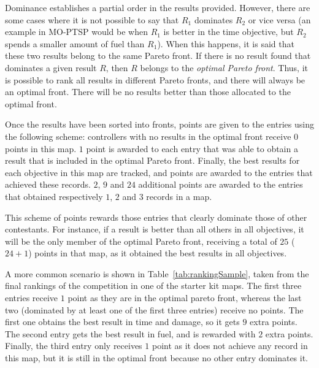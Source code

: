 \documentclass[conference]{IEEEtran}
\begin{document}
Dominance establishes a partial order in the results provided. However, there are some cases where it is not possible to say that $R_1$ dominates $R_2$ or vice versa (an example in MO-PTSP would be when $R_1$ is better in the time objective, but $R_2$ spends a smaller amount of fuel than $R_1$). When this happens, it is said that these two results belong to the same Pareto front. If there is no result found that dominates a given result $R$, then $R$ belongs to the \textit{optimal Pareto front}. Thus, it is possible to rank all results in different Pareto fronts, and there will always be an optimal front. There will be no results better than those allocated to the optimal front. 

Once the results have been sorted into fronts, points are given to the entries using the following scheme: controllers with no results in the optimal front receive $0$ points in this map. $1$ point is awarded to each entry that was able to obtain a result that is included in the optimal Pareto front. Finally, the best results for each objective in this map are tracked, and points are awarded to the entries that achieved these records. $2$, $9$ and $24$ additional points are awarded to the entries that obtained respectively $1$, $2$ and $3$ records in a map.

This scheme of points rewards those entries that clearly dominate those of other contestants. For instance, if a result is better than all others in all objectives, it will be the only member of the optimal Pareto front, receiving a total of $25$ ($24 + 1$) points in that map, as it obtained the best results in all objectives.

A more common scenario is shown in Table~\ref{tab:rankingSample}, taken from the final rankings of the competition in one of the starter kit maps. The first three entries receive $1$ point as they are in the optimal pareto front, whereas the last two (dominated by at least one of the first three entries) receive no points. The first one obtains the best result in time and damage, so it gets $9$ extra points. The second entry gets the best result in fuel, and is rewarded with $2$ extra points. Finally, the third entry only receives $1$ point as it does not achieve any record in this map, but it is still in the optimal front because no other entry dominates it.
\end{document}
